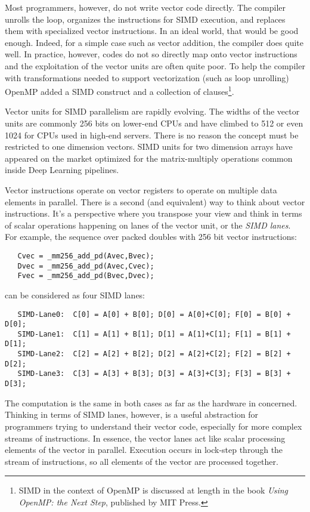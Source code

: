 Most programmers, however, do not write vector code directly.  The compiler unrolls the loop, organizes the instructions for SIMD
execution, and replaces them with specialized vector instructions.  In an ideal world, that would be good enough. Indeed,
for a simple case such as vector addition, the compiler does quite well.  In practice, however, codes do not so directly map
onto vector instructions and the exploitation of the vector units are often quite poor.
To help the compiler with transformations needed to support vectorization (such as loop unrolling) OpenMP added
a SIMD construct and a collection of clauses\footnote{SIMD in the context of OpenMP is discussed at length in the book
\emph{Using OpenMP: the Next Step}, published by MIT Press.}.

Vector units for SIMD parallelism are rapidly evolving.  The widths of the vector units are commonly 256 bits on lower-end
CPUs and have climbed to 512 or even 1024 for CPUs used in high-end servers.  There is no reason the concept must 
be restricted to one dimension vectors.   SIMD units for two dimension arrays have appeared on the market optimized
for the matrix-multiply operations common inside Deep Learning pipelines. 

Vector instructions operate on vector registers to operate on multiple data elements in parallel. There is a second (and equivalent)
way to think about vector instructions.   It's a perspective where you transpose your view and think in terms of scalar operations
happening on lanes of the vector unit, or the \emph{SIMD lanes}.   For example, the 
sequence over packed doubles with 256 bit vector instructions:
\begin{verbatim}
   Cvec = _mm256_add_pd(Avec,Bvec);
   Dvec = _mm256_add_pd(Avec,Cvec);
   Fvec = _mm256_add_pd(Bvec,Dvec);
\end{verbatim}
can be considered as four SIMD lanes:
\begin{verbatim}
   SIMD-Lane0:  C[0] = A[0] + B[0]; D[0] = A[0]+C[0]; F[0] = B[0] + D[0];
   SIMD-Lane1:  C[1] = A[1] + B[1]; D[1] = A[1]+C[1]; F[1] = B[1] + D[1];
   SIMD-Lane2:  C[2] = A[2] + B[2]; D[2] = A[2]+C[2]; F[2] = B[2] + D[2];
   SIMD-Lane3:  C[3] = A[3] + B[3]; D[3] = A[3]+C[3]; F[3] = B[3] + D[3];
\end{verbatim}
The computation is the same in both cases as far as the hardware in concerned.  Thinking in terms
of SIMD lanes, however, is a useful abstraction for programmers trying to understand their vector code,
especially for more complex streams of instructions.  In essence, the vector lanes act like scalar processing 
elements of the vector in parallel. Execution occurs in lock-step through the stream of instructions, so all elements of the
vector are processed together.

